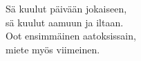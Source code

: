 
Sä kuulut päivään jokaiseen, \\ sä kuulut aamuun ja iltaan. \\ Oot ensimmäinen aatoksissain, \\ miete myös viimeinen.